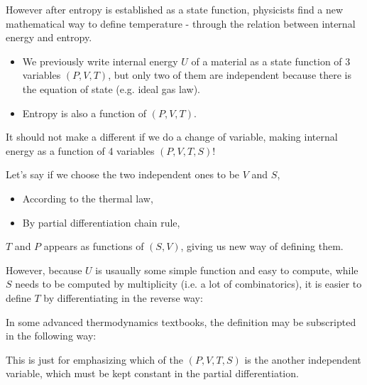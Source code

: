 \documentclass[class=article, crop=false, 12pt]{standalone}
\begin{document}
However after entropy is established as a state function,
physicists find a new mathematical way to define temperature - 
through the relation between internal energy and entropy.
\begin{itemize}
    \item We previously write internal energy $U$ of a material as a state function of 3 variables $(P,V,T)$,
    but only two of them are independent because there is the equation of state (e.g. ideal gas law).

    \item Entropy is also a function of $(P,V,T)$.
\end{itemize}

It should not make a different if we do a change of variable,
making internal energy as a function of 4 variables $(P,V,T,S)$!

Let's say if we choose the two independent ones to be $V$ and $S$,
\begin{itemize}
    \item According to the thermal  law,

    \item By partial differentiation chain rule,
\end{itemize}

$T$ and $P$ appears as functions of $(S,V)$,
giving us new way of defining them.

\begin{center}
\end{center}

However, because $U$ is usaually some simple function and easy to compute,
while $S$ needs to be computed by multiplicity (i.e. a lot of combinatorics),
it is easier to define $T$ by differentiating in the reverse way:


\begin{notation}
    In some advanced thermodynamics textbooks, 
    the definition may be subscripted in the following way:

    This is just for emphasizing which of the $(P,V,T,S)$ is the another independent variable,
    which must be kept constant in the partial differentiation.

\end{notation}
\end{document}
